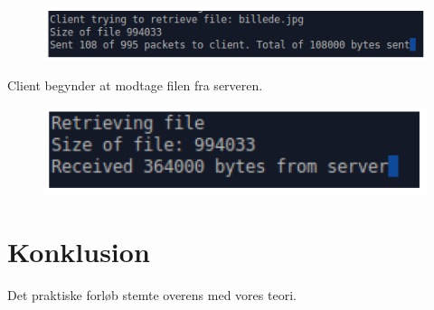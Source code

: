 \begin{figure}[H]
	\centering
	\includegraphics[width=0.7\linewidth]{figs/test3}
	\caption{}
	\label{fig:test3}
\end{figure}

Client begynder at modtage filen fra serveren.

\begin{figure}[H]
	\centering
	\includegraphics[width=0.5\linewidth]{figs/test4}
	\caption{}
	\label{fig:test4}
\end{figure}

\section{Konklusion}
Det praktiske forløb stemte overens med vores teori.